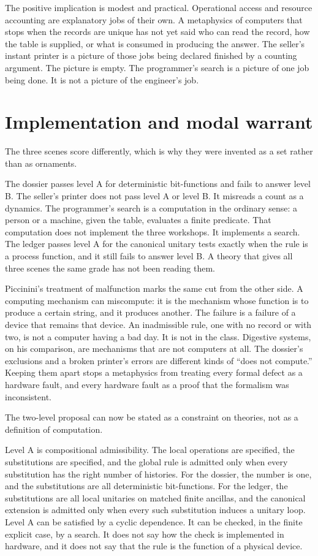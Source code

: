 \documentclass[11pt]{article}
\begin{document}
The positive implication is modest and practical. Operational access and resource accounting are explanatory jobs of their own. A metaphysics of computers that stops when the records are unique has not yet said who can read the record, how the table is supplied, or what is consumed in producing the answer. The seller’s instant printer is a picture of those jobs being declared finished by a counting argument. The picture is empty. The programmer’s search is a picture of one job being done. It is not a picture of the engineer’s job.

\section{Implementation and modal warrant}
\label{sec:impl}

The three scenes score differently, which is why they were invented as a set rather than as ornaments.

The dossier passes level A for deterministic bit-functions and fails to answer level B. The seller’s printer does not pass level A or level B. It misreads a count as a dynamics. The programmer’s search is a computation in the ordinary sense: a person or a machine, given the table, evaluates a finite predicate. That computation does not implement the three workshops. It implements a search. The ledger passes level A for the canonical unitary tests exactly when the rule is a process function, and it still fails to answer level B. A theory that gives all three scenes the same grade has not been reading them.

Piccinini’s treatment of malfunction marks the same cut from the other side. A computing mechanism can miscompute: it is the mechanism whose function is to produce a certain string, and it produces another. The failure is a failure of a device that remains that device. An inadmissible rule, one with no record or with two, is not a computer having a bad day. It is not in the class. Digestive systems, on his comparison, are mechanisms that are not computers at all. The dossier’s exclusions and a broken printer’s errors are different kinds of “does not compute.” Keeping them apart stops a metaphysics from treating every formal defect as a hardware fault, and every hardware fault as a proof that the formalism was inconsistent.

The two-level proposal can now be stated as a constraint on theories, not as a definition of computation.

Level A is compositional admissibility. The local operations are specified, the substitutions are specified, and the global rule is admitted only when every substitution has the right number of histories. For the dossier, the number is one, and the substitutions are all deterministic bit-functions. For the ledger, the substitutions are all local unitaries on matched finite ancillas, and the canonical extension is admitted only when every such substitution induces a unitary loop. Level A can be satisfied by a cyclic dependence. It can be checked, in the finite explicit case, by a search. It does not say how the check is implemented in hardware, and it does not say that the rule is the function of a physical device.
\end{document}
